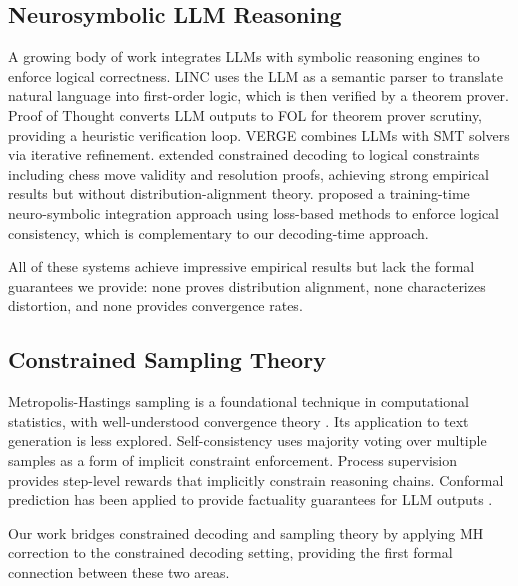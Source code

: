\documentclass[twoside,11pt]{article}
\begin{document}
\subsection{Neurosymbolic LLM Reasoning}
\label{sec:related-neurosymbolic}

A growing body of work integrates LLMs with symbolic reasoning engines to
enforce logical correctness. LINC \citep{olausson2023linc} uses the LLM as
a semantic parser to translate natural language into first-order logic,
which is then verified by a theorem prover. Proof of Thought
\citep{ganguly2024pot} converts LLM outputs to FOL for theorem prover
scrutiny, providing a heuristic verification loop. VERGE \citep{verge2026}
combines LLMs with SMT solvers via iterative refinement.
\citet{ma2025logically} extended constrained decoding to logical constraints
including chess move validity and resolution proofs, achieving strong
empirical results but without distribution-alignment theory.
\citet{calanzone2024logically} proposed a training-time neuro-symbolic
integration approach using loss-based methods to enforce logical consistency,
which is complementary to our decoding-time approach.

All of these systems achieve impressive empirical results but lack the
formal guarantees we provide: none proves distribution alignment, none
characterizes distortion, and none provides convergence rates.

\subsection{Constrained Sampling Theory}
\label{sec:related-sampling}

Metropolis-Hastings sampling \citep{metropolis1953equation, hastings1970monte}
is a foundational technique in computational statistics, with well-understood
convergence theory \citep{roberts2004general, tierney1994markov}. Its
application to text generation is less explored. Self-consistency
\citep{wang2022selfconsistency} uses majority voting over multiple
samples as a form of implicit constraint enforcement. Process supervision
\citep{lightman2023lets} provides step-level rewards that implicitly
constrain reasoning chains. Conformal prediction has been applied to
provide factuality guarantees for LLM outputs
\citep{mohri2024conformal}.

Our work bridges constrained decoding and sampling theory by applying MH
correction to the constrained decoding setting, providing the first formal
connection between these two areas.
\end{document}

